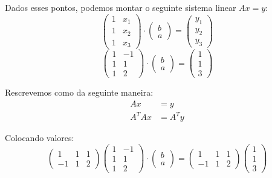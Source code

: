 \documentclass[12pt]{article}
\begin{document}
Dados esses pontos, podemos montar o seguinte sistema linear $Ax=y$:
\begin{equation*}
	\begin{pmatrix}
		1 & x_{1} \\
		1 & x_{2}\\
		1 & x_{3} 
	\end{pmatrix}\cdot 
	\begin{pmatrix}
		b \\
		a 
	\end{pmatrix}=
	\begin{pmatrix}
		y_1 \\
		y_2 \\
		y_3
	\end{pmatrix}
\end{equation*}
\begin{equation*}
	\begin{pmatrix}
		1 & -1 \\
		1 & 1\\
		1 & 2 
	\end{pmatrix}\cdot 
	\begin{pmatrix}
		b \\
		a 
	\end{pmatrix}=
	\begin{pmatrix}
		1 \\
		1 \\
		3
	\end{pmatrix}
\end{equation*}

Rescrevemos como da seguinte maneira:
\begin{align*}
	Ax&=y\\
	A^TAx&=A^Ty
\end{align*}

Colocando valores:
\begin{equation*}
	\begin{pmatrix}
		1 &1 &1\\
		-1 &1& 2
	\end{pmatrix}
	\begin{pmatrix}
		1 & -1 \\
		1 & 1\\
		1 & 2 
	\end{pmatrix}\cdot 
	\begin{pmatrix}
		b \\
		a 
	\end{pmatrix}=
	\begin{pmatrix}
		1 &1 &1\\
		-1 &1& 2
	\end{pmatrix}
	\begin{pmatrix}
		1 \\
		1 \\
		3
	\end{pmatrix}
\end{equation*}
\end{document}
